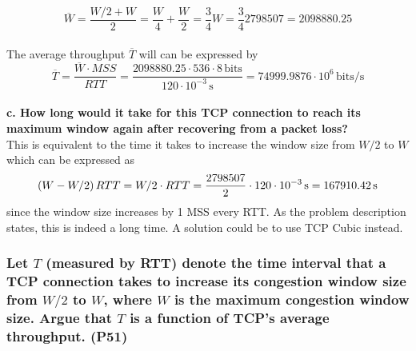 \begin{equation*}
    \overline{W} = \frac{W/2 + W}{2} = \frac{W}{4} + \frac{W}{2} = \frac{3}{4} W = \frac{3}{4} 2798507 = 2098880.25
\end{equation*}
\\
The average throughput $\overline{T}$ will can be expressed by
\begin{equation*}
    \overline{T} = \frac{\overline{W} \cdot MSS}{RTT} = \frac{2098880.25 \cdot 536 \cdot 8 \, \text{bits}}{120 \cdot 10^{-3} \, \text{s}} = 74999.9876 \cdot 10^6 \, \text{bits/s}
\end{equation*}
\\
\textbf{c. How long would it take for this TCP connection to reach its maximum window again after recovering from a packet loss?} \\
This is equivalent to the time it takes to increase the window size from $W/2$ to $W$ which can be expressed as
\begin{equation*}
    \left (W - W/2\right) RTT = W/2 \cdot RTT  = \frac{2798507}{2} \cdot 120 \cdot 10^{-3} \, \text{s} = 167910.42 \, \text{s}
\end{equation*}
since the window size increases by 1 MSS every RTT. As the problem description states, this is indeed a long time. A solution could be to use TCP Cubic instead.


\subsubsection{Let $T$ (measured by RTT) denote the time interval that a TCP connection takes to increase its congestion window size from $W/2$ to $W$, where $W$ is the maximum congestion window size. Argue that $T$ is a function of TCP's average throughput. (P51)}

